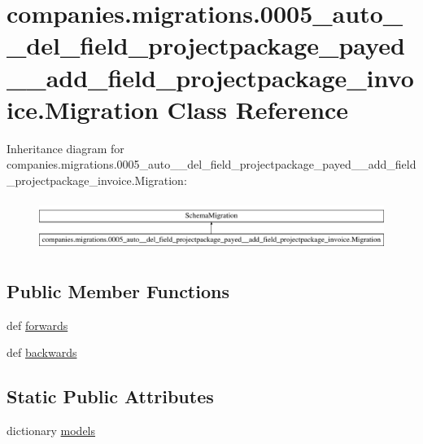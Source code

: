 \hypertarget{classcompanies_1_1migrations_1_10005__auto____del__field__projectpackage__payed____add__field__pe9cf5cf6afe1151e043f1d94db59b0b0}{\section{companies.\-migrations.0005\-\_\-auto\-\_\-\-\_\-del\-\_\-field\-\_\-projectpackage\-\_\-payed\-\_\-\-\_\-add\-\_\-field\-\_\-projectpackage\-\_\-invoice.Migration Class Reference}
\label{classcompanies_1_1migrations_1_10005__auto____del__field__projectpackage__payed____add__field__pe9cf5cf6afe1151e043f1d94db59b0b0}
}
Inheritance diagram for companies.\-migrations.0005\-\_\-auto\-\_\-\-\_\-del\-\_\-field\-\_\-projectpackage\-\_\-payed\-\_\-\-\_\-add\-\_\-field\-\_\-projectpackage\-\_\-invoice.Migration\-:\begin{figure}[H]
\begin{center}
\leavevmode
\includegraphics[height=1.679160cm]{classcompanies_1_1migrations_1_10005__auto____del__field__projectpackage__payed____add__field__pe9cf5cf6afe1151e043f1d94db59b0b0}
\end{center}
\end{figure}
\subsection*{Public Member Functions}
\begin{DoxyCompactItemize}
\item 
def \hyperlink{classcompanies_1_1migrations_1_10005__auto____del__field__projectpackage__payed____add__field__pe9cf5cf6afe1151e043f1d94db59b0b0_a9f73b04676982d2dfa0c5f86abe636f3}{forwards}
\item 
def \hyperlink{classcompanies_1_1migrations_1_10005__auto____del__field__projectpackage__payed____add__field__pe9cf5cf6afe1151e043f1d94db59b0b0_a4f4cd3353db7f89ef231bdafddc1c30f}{backwards}
\end{DoxyCompactItemize}
\subsection*{Static Public Attributes}
\begin{DoxyCompactItemize}
\item 
dictionary \hyperlink{classcompanies_1_1migrations_1_10005__auto____del__field__projectpackage__payed____add__field__pe9cf5cf6afe1151e043f1d94db59b0b0_a0c8c1d59142a9baf9c7f625b38883cec}{models}
\end{DoxyCompactItemize}


